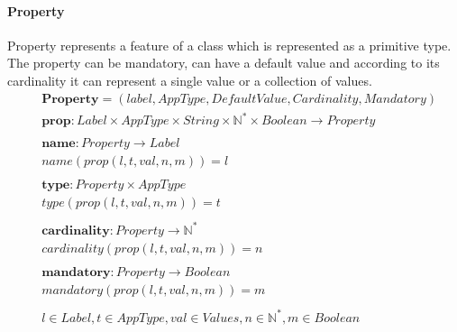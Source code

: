 \documentclass[11pt]{article}
\begin{document}
\paragraph{Property} Property represents a feature of a class which is represented as a primitive type. The property can be mandatory, can have a default value and according to its cardinality it can represent a single value or a collection of values. 
\begin{align*}
&	\mathbf{Property} = (label, AppType, DefaultValue, Cardinality, Mandatory) \\
&	\mathbf{prop} : Label \times AppType \times String \times \mathbb{N^{*}} \times Boolean \rightarrow Property \\ \\
&	\mathbf{name} : Property \rightarrow Label \\
&	name(prop(l, t, val, n, m)) = l \\ \\
&	\mathbf{type} : Property \times AppType \\
&	type(prop(l, t, val, n, m)) = t \\ \\
&	\mathbf{cardinality} : Property \rightarrow \mathbb{N^{*}} \\
&	cardinality(prop(l, t, val, n, m)) = n \\ \\
&	\mathbf{mandatory} : Property \rightarrow Boolean \\
&	mandatory(prop(l, t, val, n, m)) = m  \\ \\
&	l \in Label, t \in AppType, val \in Values, n \in \mathbb{N^{*}}, m \in Boolean 
\end{align*}
\end{document}
